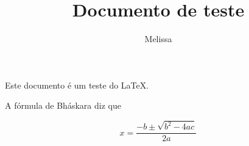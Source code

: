 \documentclass{article}
\title{Documento de teste}
\author{Melissa}
\begin{document}
Este documento é um teste do \LaTeX.

A fórmula de Bháskara diz que

$$ x = \frac{-b\pm \sqrt{b^2-4ac}}{2a}$$
\end{document}
